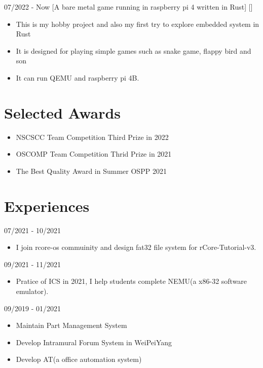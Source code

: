 \documentclass{chicv}
\begin{document}
  {07/2022 - Now}
  [A bare metal game running in raspberry pi 4 written in Rust]
  []
  \begin{itemize}
    \item This is my hobby project and also my first try to explore embedded system in Rust 
    \item It is designed for playing simple games such as snake game, flappy bird and son 
    \item It can run QEMU and raspberry pi 4B.
  \end{itemize}

\section{Selected Awards}
\begin{itemize}
  \item NSCSCC Team Competition Third Prize in 2022
  \item OSCOMP Team Competition Thrid Prize in 2021
  \item The Best Quality Award in Summer OSPP 2021
\end{itemize}

\section{Experiences}
{07/2021 - 10/2021}
\begin{itemize}
  \item I join rcore-os commuinity and design fat32 file system for rCore-Tutorial-v3.
\end{itemize}

{09/2021 - 11/2021}
\begin{itemize}
  \item Pratice of ICS in 2021, I help students complete NEMU(a x86-32 software emulator).
\end{itemize}

{09/2019 - 01/2021}
\begin{itemize}
  \item Maintain Part Management System 
  \item Develop Intramural Forum System in WeiPeiYang
  \item Develop AT(a office automation system)
\end{itemize}
\end{document}
